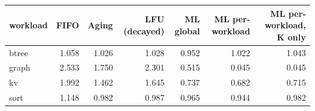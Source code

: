 \begin{tabular}{lrrrrrr}
\toprule
workload & FIFO & Aging & LFU (decayed) & ML global & ML per-workload & ML per-workload, K only \\
\midrule
btree & 1.058 & 1.026 & 1.028 & 0.952 & 1.022 & 1.043 \\
graph & 2.533 & 1.750 & 2.301 & 0.515 & 0.045 & 0.045 \\
kv & 1.992 & 1.462 & 1.645 & 0.737 & 0.682 & 0.715 \\
sort & 1.148 & 0.982 & 0.987 & 0.965 & 0.944 & 0.982 \\
\bottomrule
\end{tabular}
